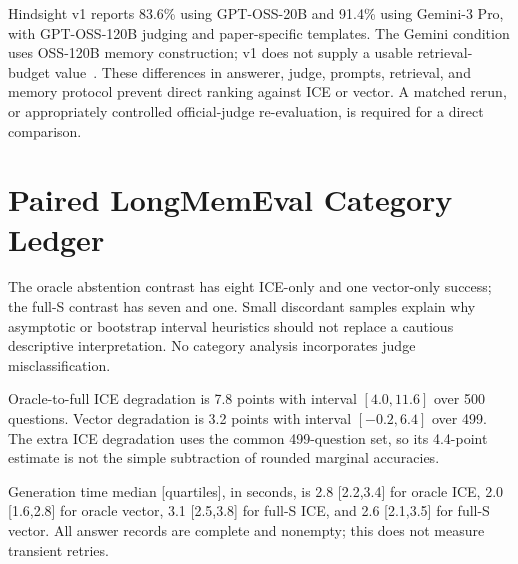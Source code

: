\documentclass[11pt]{article}
\begin{document}
Hindsight v1 reports 83.6\% using GPT-OSS-20B and 91.4\% using Gemini-3 Pro, with GPT-OSS-120B judging and paper-specific templates. The Gemini condition uses OSS-120B memory construction; v1 does not supply a usable retrieval-budget value~\citep{latimer2025hindsight}. These differences in answerer, judge, prompts, retrieval, and memory protocol prevent direct ranking against ICE or vector. A matched rerun, or appropriately controlled official-judge re-evaluation, is required for a direct comparison.
\section{Paired LongMemEval Category Ledger}

The oracle abstention contrast has eight ICE-only and one vector-only success; the full-S contrast has seven and one. Small discordant samples explain why asymptotic or bootstrap interval heuristics should not replace a cautious descriptive interpretation. No category analysis incorporates judge misclassification.

Oracle-to-full ICE degradation is 7.8 points with interval $[4.0,11.6]$ over 500 questions. Vector degradation is 3.2 points with interval $[-0.2,6.4]$ over 499. The extra ICE degradation uses the common 499-question set, so its 4.4-point estimate is not the simple subtraction of rounded marginal accuracies.

Generation time median [quartiles], in seconds, is 2.8 [2.2,3.4] for oracle ICE, 2.0 [1.6,2.8] for oracle vector, 3.1 [2.5,3.8] for full-S ICE, and 2.6 [2.1,3.5] for full-S vector. All answer records are complete and nonempty; this does not measure transient retries.
\end{document}
